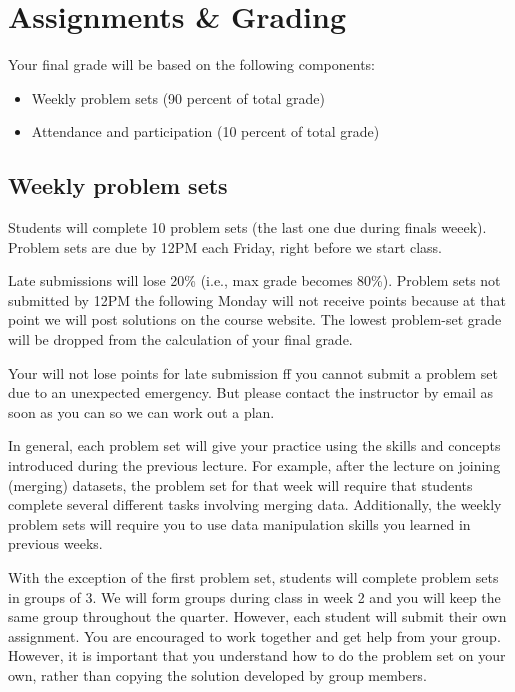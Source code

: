 \documentclass[11pt,]{article}
\providecommand{\tightlist}{%
  \setlength{\itemsep}{0pt}\setlength{\parskip}{0pt}}
\begin{document}
\hypertarget{assignments-grading}{%
\section{Assignments \& Grading}\label{assignments-grading}}

Your final grade will be based on the following components:

\begin{itemize}
\tightlist
\item
  Weekly problem sets (90 percent of total grade)
\item
  Attendance and participation (10 percent of total grade)
\end{itemize}

\hypertarget{weekly-problem-sets}{%
\subsection{Weekly problem sets}\label{weekly-problem-sets}}

Students will complete 10 problem sets (the last one due during finals
weeek). Problem sets are due by 12PM each Friday, right before we start
class.

Late submissions will lose 20\% (i.e., max grade becomes 80\%). Problem
sets not submitted by 12PM the following Monday will not receive points
because at that point we will post solutions on the course website. The
lowest problem-set grade will be dropped from the calculation of your
final grade.

Your will not lose points for late submission ff you cannot submit a
problem set due to an unexpected emergency. But please contact the
instructor by email as soon as you can so we can work out a plan.

In general, each problem set will give your practice using the skills
and concepts introduced during the previous lecture. For example, after
the lecture on joining (merging) datasets, the problem set for that week
will require that students complete several different tasks involving
merging data. Additionally, the weekly problem sets will require you to
use data manipulation skills you learned in previous weeks.

With the exception of the first problem set, students will complete
problem sets in groups of 3. We will form groups during class in week 2
and you will keep the same group throughout the quarter. However, each
student will submit their own assignment. You are encouraged to work
together and get help from your group. However, it is important that you
understand how to do the problem set on your own, rather than copying
the solution developed by group members.
\end{document}

